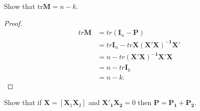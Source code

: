 \documentclass[12pt]{article}
\newenvironment{question}[2][Question]{\begin{trivlist}
\item[\hskip \labelsep {\bfseries #1}\hskip \labelsep {\bfseries #2.}]}{\end{trivlist}}
\begin{document}
\begin{question}{3.9}
Show that tr$\bm{M} = n-k$.
\end{question}

\begin{proof}
\begin{align*}
tr\bm{M}&=tr(\bm{I}_n-\bm{P})\\
&=tr\bm{I}_n-tr\bm{X(X'X)^{-1}X'}\\
&=n-tr\bm{(X'X)^{-1}X'X}\\
&=n-tr\bm{I}_k\\
&=n-k.
\end{align*}
\end{proof}

\begin{question}{3.10}
Show that if $\bm{X} = [\bm{X}_1\bm{X}_2]$ and $\bm{X'_1X_2} = 0$ then $\bm{P} = \bm{P_1}+\bm{P_2}$.
\end{question}
\end{document}
